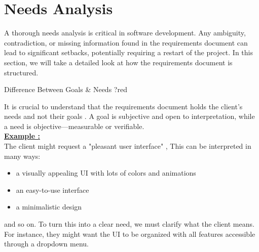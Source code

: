 \section{Needs Analysis}
A thorough needs analysis is critical in software development. Any ambiguity, contradiction, or missing information found in the
requirements document can lead to significant setbacks, potentially requiring a restart of the project. In this section, we will
take a detailed look at how the requirements document is structured.

\begin{prettyBox}{Difference Between Goals \& Needs ?}{red} 

It is crucial to understand that the requirements document holds the client's needs and not their goals . A goal is subjective and
open to interpretation, while a need is objective—measurable or verifiable.\\

\textbf{\underline{Example :}}\\

The client might request a "pleasant user interface" , This can be interpreted in many ways:
\begin{itemize}
    \item a visually appealing UI with lots of colors and animations   
    \item an easy-to-use interface
    \item a minimalistic design
\end{itemize} 

and so on. To turn this into a clear need, we must clarify what the client means. For instance, they might want the UI to be 
organized with all features accessible through a dropdown menu.

\end{prettyBox}

